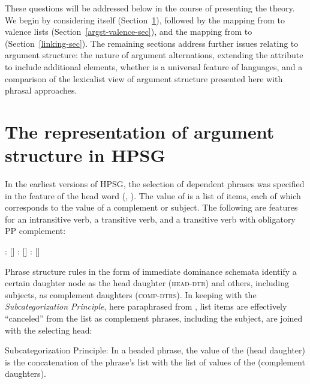 \documentclass[output=paper
 	        ,biblatex
                ,babelshorthands
                ,newtxmath
                ,draftmode
                ,colorlinks, citecolor=brown
]{langscibook}
\begin{document}
\noindent
These questions will be addressed below in the course of presenting the theory.  We begin by
considering \argst itself (Section~\ref{sec:arg-st}), followed by the mapping from \argst to
valence lists (Section~\ref{argst-valence-sec}), and the mapping from \content to \argst
(Section~\ref{linking-sec}). The remaining sections
address further issues relating to argument structure: the nature of argument alternations,
extending the \argst attribute to include additional elements, whether \argst is a universal feature
of languages, and a comparison of the lexicalist view of argument structure presented here with
phrasal approaches. 


\section{The representation of argument structure in HPSG}
\label{sec:arg-st}

In the earliest versions of HPSG, the selection of dependent phrases was specified in the \subcat
feature of the head word (\citealt{pollard+sag:1987},
\citealt[Chapters~1--8]{pollard+sag:1994}).  The value of \subcat is a list of items, each of which
corresponds to the \synsem value of a complement or subject.  The following are \subcat features for
an intransitive verb, a transitive verb, and a transitive verb with obligatory PP complement:


\begin{exe} 
\ex \label{subcats}
\begin{xlist}
\ex {}: $[$\subcat {}$]$
\ex {}:   $[$\subcat {}$]$
\ex {}:   $[$\subcat {}$]$
\end{xlist}
\end{exe}

\noindent
Phrase structure rules in the form of immediate dominance schemata
identify a certain daughter node as the head daughter (\textsc{head-dtr}) and others, including
subjects, as complement daughters (\textsc{comp-dtrs}).  In keeping with the \emph{Subcategorization
  Principle}, here paraphrased from ,
list items are effectively ``canceled'' from the \subcat list as complement phrases, including the
subject, are joined with the selecting head:

\begin{exe}
  \ex Subcategorization Principle: In a headed phrase, the \subcat value of the \headdtr (head
  daughter) is the concatenation of the phrase's \subcat list with the list of \synsem values of the
  \compsdtrs (complement daughters).
\end{exe}
\end{document}
